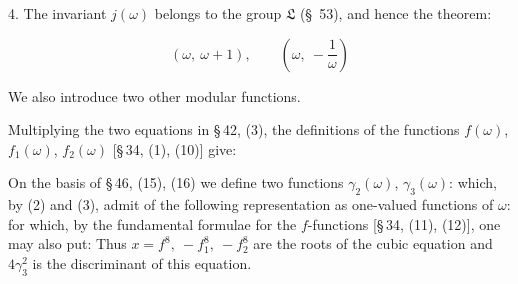 4. The invariant $j(\omega)$ belongs to the group $\mathfrak{L}$ (\S\ 53), and
hence the theorem:

\[
(\omega,\ \omega+1), \qquad \left(\omega,\ -\frac{1}{\omega}\right)
\]

We also introduce two other modular functions.

Multiplying the two equations in \S\,42, (3), the definitions of the functions
$f(\omega)$, $f_1(\omega)$, $f_2(\omega)$ [\S\,34, (1), (10)] give:

On the basis of \S\,46, (15), (16) we define two functions
 $\gamma_2(\omega)$, $\gamma_3(\omega)$:
which, by (2) and (3), admit of the following representation as one-valued
 functions of $\omega$:
for which, by the fundamental formulae for the $f$-functions [\S\,34,
(11), (12)], one may also put:
Thus $x = f^8,\ -f_1^8,\ -f_2^8$ are the roots of the cubic
equation
and $4\gamma_3^2$ is the discriminant of this equation.
